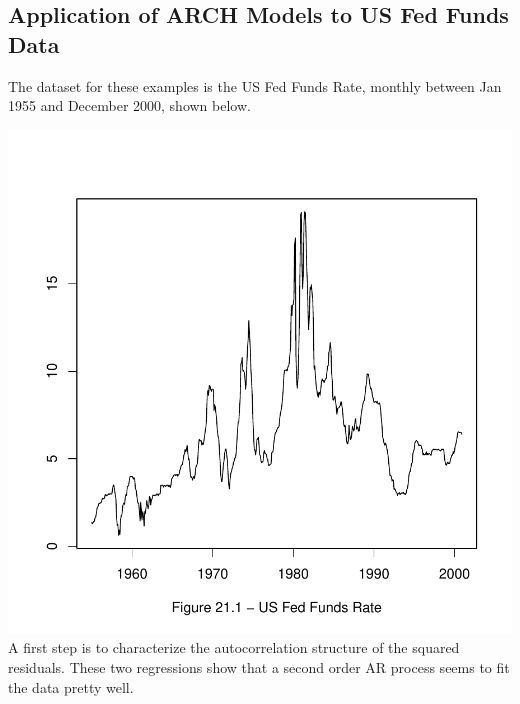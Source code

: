 \subsection{Application of ARCH Models to US Fed Funds Data}
The dataset for these examples is the US Fed Funds Rate, monthly between Jan 1955 and December 2000,
shown below.
\begin{Schunk}
\end{Schunk}
\includegraphics{p660-007}
A first step is to characterize the autocorrelation structure of the squared residuals.  These two regressions
show that a second order AR process seems to fit the data pretty well.
